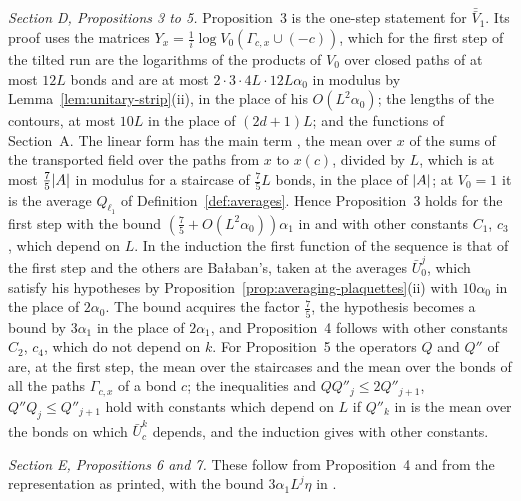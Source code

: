 \documentclass[11pt]{preprint}
\DeclarePairedDelimiter{\abs}{\lvert}{\rvert}
\numberwithin{equation}{section}
\theoremstyle{definition}
\theoremstyle{remark}
\theoremstyle{plain}
\begin{document}
\emph{Section D, Propositions 3 to 5.} Proposition~3 is the one-step statement for $\bar{\bar V}_1$. Its proof \cite[(109)--(126)]{BalabanAVG} uses the matrices $Y_x = \frac1i\log V_0(\Gamma_{c,x} \cup (-c))$, which for the first step of the tilted run are the logarithms of the products of $V_0$ over closed paths of at most $12L$ bonds and are at most $2 \cdot 3 \cdot 4L \cdot 12L\alpha_0$ in modulus by Lemma~\ref{lem:unitary-strip}(ii), in the place of his $O(L^2\alpha_0)$; the lengths of the contours, at most $10L$ in the place of $(2d + 1)L$; and the functions of Section~A. The linear form \cite[(124)]{BalabanAVG} has the main term \cite[(125)]{BalabanAVG}, the mean over $x$ of the sums of the transported field over the paths from $x$ to $x(c)$, divided by $L$, which is at most $\frac75\abs A$ in modulus for a staircase of $\frac75L$ bonds, in the place of $\abs A$; at $V_0 = 1$ it is the average $Q_{\ell_1}$ of Definition~\ref{def:averages}. Hence Proposition~3 holds for the first step with the bound $(\frac75 + O(L^2\alpha_0))\alpha_1$ in \cite[(126)]{BalabanAVG} and with other constants $C_1$, $c_3$, which depend on $L$. In the induction \cite[(127)--(133)]{BalabanAVG} the first function of the sequence \cite[(127)]{BalabanAVG} is that of the first step and the others are Ba{\l}aban's, taken at the averages $\bar U_0^j$, which satisfy his hypotheses by Proposition~\ref{prop:averaging-plaquettes}(ii) with $10\alpha_0$ in the place of $2\alpha_0$. The bound \cite[(128)]{BalabanAVG} acquires the factor $\frac75$, the hypothesis \cite[(131)]{BalabanAVG} becomes a bound by $3\alpha_1$ in the place of $2\alpha_1$, and Proposition~4 follows with other constants $C_2$, $c_4$, which do not depend on $k$. For Proposition~5 the operators $Q$ and $Q''$ of \cite[(139), (140)]{BalabanAVG} are, at the first step, the mean over the staircases and the mean over the bonds of all the paths $\Gamma_{c,x}$ of a bond $c$; the inequalities \cite[(139), (142)]{BalabanAVG} and $QQ''_j \leq 2Q''_{j+1}$, $Q''Q_j \leq Q''_{j+1}$ hold with constants which depend on $L$ if $Q''_k$ in \cite[(141)]{BalabanAVG} is the mean over the bonds on which $\bar U^k_c$ depends, and the induction \cite[(143)--(155)]{BalabanAVG} gives \cite[(156), (157)]{BalabanAVG} with other constants.

\emph{Section E, Propositions 6 and 7.} These follow from Proposition~4 and from the representation \cite[(159), (160)]{BalabanAVG} as printed, with the bound $3\alpha_1L^j\eta$ in \cite[(161)]{BalabanAVG}.
\end{document}
